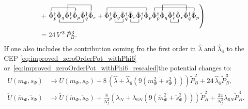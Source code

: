 \begin{align}
        \nonumber \\ 
           & +\left. \contraction{}{ \tilde\Phi }{ {}_{p}^{\dagger} \tilde\Phi_{q} \tilde\Phi_{r}^{\dagger} }{ \tilde \Phi}
                     \bcontraction{ \tilde\Phi_{p}^{\dagger} }{ \tilde\Phi }{ {}_{q} \tilde\Phi_{r}^{\dagger} \tilde\Phi_{p} }{ \tilde\Phi }
                     \contraction[2ex]{ \tilde\Phi_{p}^{\dagger} \tilde\Phi_{q} }{ \tilde\Phi }{ {}_{r}^{\dagger} \tilde\Phi_{p} \tilde\Phi_{q}^{\dagger} }{ \tilde\Phi} 
                     \tilde\Phi_{p}^{\dagger} \tilde\Phi_{q} \tilde\Phi_{r}^{\dagger} \tilde\Phi_{p} \tilde\Phi_{q}^{\dagger} \tilde\Phi_{r}
                   + \contraction{}{ \tilde\Phi }{ {}_{p}^{\dagger} \tilde\Phi_{q} \tilde\Phi_{q}^{\dagger} \tilde\Phi_{r} \tilde\Phi_{r}^{\dagger} }{ \tilde\Phi}
                     \bcontraction{ \tilde\Phi_{p}^{\dagger} }{ \tilde\Phi }{ {}_{q} }{ \tilde\Phi }
                     \bcontraction{ \tilde\Phi_{p}^{\dagger} \tilde\Phi_{q} \tilde\Phi_{q}^{\dagger} }{ \tilde\Phi }{ {}_{r} }{ \tilde\Phi}
                     \tilde\Phi_{p}^{\dagger} \tilde\Phi_{q} \tilde\Phi_{q}^{\dagger} \tilde\Phi_{r} \tilde\Phi_{r}^{\dagger} \tilde\Phi_{p}
                     \contraction{}{ \tilde\Phi }{ {}_{p}^{\dagger} \tilde\Phi_{q} \tilde\Phi_{r}^{\dagger} \tilde\Phi_{r} \tilde\Phi_{q}^{\dagger} }{ \tilde \Phi }
                     \contraction[2ex]{ \tilde\Phi_{p}^{\dagger} }{ \tilde\Phi }{ {}_{q} \tilde\Phi_{r}^{\dagger} \tilde\Phi_{r} }{\tilde \Phi}
                     \bcontraction{ \tilde\Phi_{p}^{\dagger} \tilde\Phi_{q} }{ \tilde\Phi }{ {}_{r}^{\dagger} }{ \tilde\Phi }
                     \tilde\Phi_{p}^{\dagger} \tilde\Phi_{q} \tilde\Phi_{r}^{\dagger} \tilde\Phi_{r} \tilde\Phi_{q}^{\dagger} \tilde\Phi_{p}
                     \right)
        \nonumber \\
                 & = 24\, V^3\, \tilde P_B^3.
\end{align}
If one also includes the contribution coming fro the first order in $\hat\lambda$ and $\hat\lambda_6$ to the CEP \eqref{eq:improved_zeroOrderPot_withPhi6} 
or~\eqref{eq:improved_zeroOrderPot_withPhi6_rescaled}the potential
changes to:
\begin{align}\label{eq:CEP_oneLoopAddition_withDetAndLambda6}
 U(m_{\Phi}, s_{\Phi}) & \rightarrow U(m_{\Phi}, s_{\Phi}) + 8\,\left(\hat \lambda + \hat\lambda_6\left( 9\left( m_{\Phi}^2 + s_{\Phi}^2 \right) \right) \right) \tilde P_B^2
                        + 24\, \hat\lambda_6 \tilde P_B^3,
      \\ \label{eq:CEP_oneLoopAddition_withDetAndLambda6_rescaled}
 \tilde U(\breve{m}_{\Phi},\breve{s}_{\Phi}) & \rightarrow  
       \tilde U(\breve{m}_{\Phi},\breve{s}_{\Phi}) + 
                        \frac{8}{N_f^2} \left( \lambda_N + \lambda_{6N} \left( 9\left( \breve{m}_{\Phi}^2 + \breve{s}_{\Phi}^2 \right) \right) \right) \tilde P_B^2
                        + \frac{24}{N_f^3} \lambda_{6N} \tilde P_B^3.
\end{align}
